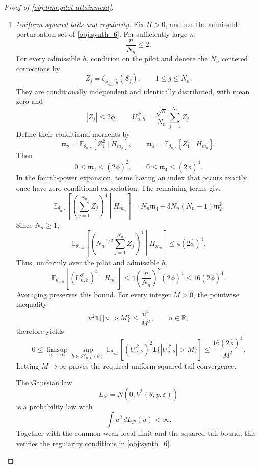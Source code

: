\begin{proof}[Proof of \cref{obj:thm:pilot-attainment}]
\begin{enumerate}
\item \emph{Uniform squared tails and regularity.}
Fix \(H>0\), and use the admissible perturbation set of \cref{obj:synth_6}. For sufficiently large \(n\),
\[
\frac n{N_n}\le2.
\]
For every admissible \(h\), condition on the pilot and denote the \(N_n\) centered corrections by
\[
Z_j=\zeta_{\theta_{n,h},\widetilde\theta}(S_j),
\qquad 1\le j\le N_n.
\]
They are conditionally independent and identically distributed, with mean zero and
\[
|Z_j|\le2\overline\phi,
\qquad
U_{n,h}^{\mathcal P}
=\frac{\sqrt n}{N_n}\sum_{j=1}^{N_n}Z_j.
\]
Define their conditional moments by
\[
\mathfrak m_2=\mathbb E_{\theta_{n,h}}[Z_1^2\mid H_{m_n}],
\qquad
\mathfrak m_4=\mathbb E_{\theta_{n,h}}[Z_1^4\mid H_{m_n}].
\]
Then
\[
0\le\mathfrak m_2\le(2\overline\phi)^2,
\qquad
0\le\mathfrak m_4\le(2\overline\phi)^4.
\]
In the fourth-power expansion, terms having an index that occurs exactly once have zero conditional expectation. The remaining terms give
\[
\mathbb E_{\theta_{n,h}}
\left[\left(\sum_{j=1}^{N_n}Z_j\right)^4\middle|H_{m_n}\right]
=
N_n\mathfrak m_4+3N_n(N_n-1)\mathfrak m_2^2.
\]
Since \(N_n\ge1\),
\[
\mathbb E_{\theta_{n,h}}
\left[\left(N_n^{-1/2}\sum_{j=1}^{N_n}Z_j\right)^4
\middle|H_{m_n}\right]
\le4(2\overline\phi)^4.
\]
Thus, uniformly over the pilot and admissible \(h\),
\[
\mathbb E_{\theta_{n,h}}
[(U_{n,h}^{\mathcal P})^4\mid H_{m_n}]
\le
4\left(\frac n{N_n}\right)^2(2\overline\phi)^4
\le16(2\overline\phi)^4.
\]
Averaging preserves this bound. For every integer \(M>0\), the pointwise inequality
\[
u^2\mathbf1\{|u|>M\}\le\frac{u^4}{M^2},
\qquad u\in\mathbb R,
\]
therefore yields
\[
0\le
\limsup_{n\to\infty}
\sup_{h\in\mathcal H_{n,H}(\theta)}
\mathbb E_{\theta_{n,h}}
\left[(U_{n,h}^{\mathcal P})^2
\mathbf1\{|U_{n,h}^{\mathcal P}|>M\}\right]
\le\frac{16(2\overline\phi)^4}{M^2}.
\]
Letting \(M\to\infty\) proves the required uniform squared-tail convergence.

The Gaussian law
\[
L_{\mathcal P}=N(0,V^*(\theta,p,\varepsilon))
\]
is a probability law with
\[
\int u^2\,dL_{\mathcal P}(u)<\infty.
\]
Together with the common weak local limit and the squared-tail bound, this verifies the regularity conditions in \cref{obj:synth_6}.


\end{enumerate}
\end{proof}
